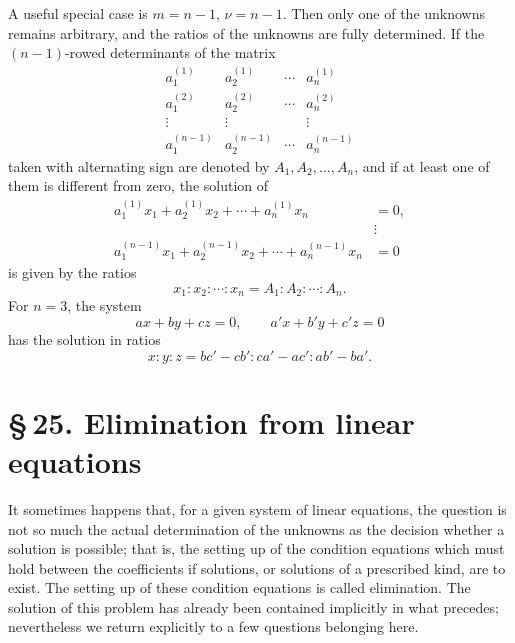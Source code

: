 \documentclass[11pt]{article}
\begin{document}
A useful special case is \(m=n-1\), \(\nu=n-1\).  Then only one of the unknowns remains arbitrary, and the ratios of the unknowns are fully determined.  If the \((n-1)\)-rowed determinants of the matrix
\begin{equation}
\begin{array}{cccc}
 a_1^{(1)}&a_2^{(1)}&\cdots&a_n^{(1)}\\
 a_1^{(2)}&a_2^{(2)}&\cdots&a_n^{(2)}\\
 \vdots&\vdots&&\vdots\\
 a_1^{(n-1)}&a_2^{(n-1)}&\cdots&a_n^{(n-1)}
\end{array}
\tag{14}
\end{equation}
taken with alternating sign are denoted by \(A_1,A_2,\ldots,A_n\), and if at least one of them is different from zero, the solution of
\begin{equation}
\begin{aligned}
 a_1^{(1)}x_1+a_2^{(1)}x_2+\cdots+a_n^{(1)}x_n&=0,\\
 &\vdots\\
 a_1^{(n-1)}x_1+a_2^{(n-1)}x_2+\cdots+a_n^{(n-1)}x_n&=0
\end{aligned}
\tag{15}
\end{equation}
is given by the ratios
\begin{equation}
        x_1:x_2:\cdots:x_n=A_1:A_2:\cdots:A_n.
\tag{16}
\end{equation}
For \(n=3\), the system
\begin{equation}
        ax+by+cz=0,\qquad a'x+b'y+c'z=0
\tag{17}
\end{equation}
has the solution in ratios
\begin{equation}
        x:y:z=bc'-cb':ca'-ac':ab'-ba'.
\tag{18}
\end{equation}

\section*{\S\,25. Elimination from linear equations}

It sometimes happens that, for a given system of linear equations, the question is not so much the actual determination of the unknowns as the decision whether a solution is possible; that is, the setting up of the condition equations which must hold between the coefficients if solutions, or solutions of a prescribed kind, are to exist.  The setting up of these condition equations is called elimination.  The solution of this problem has already been contained implicitly in what precedes; nevertheless we return explicitly to a few questions belonging here.
\end{document}
